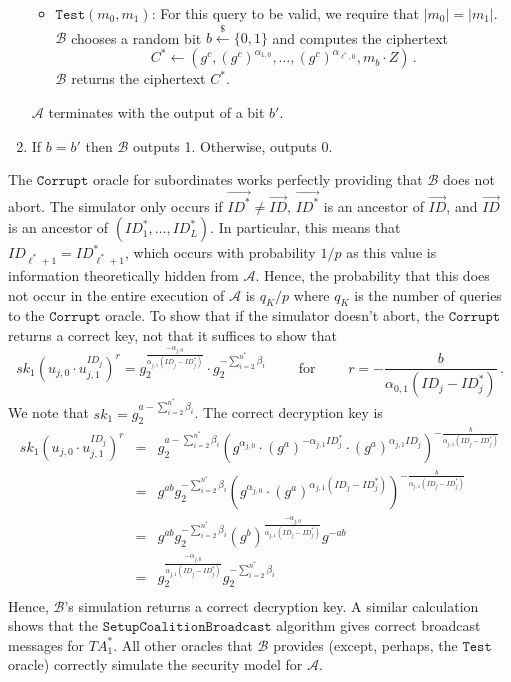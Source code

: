 \documentclass[10pt]{llncs}
\newcommand{\A}{\mathcal{A}}
\newcommand{\B}{\mathcal{B}}
\newcommand{\ID}{\mathit{ID}}
\newcommand{\TA}{\mathit{TA}}
\newcommand{\sk}{\mathit{sk}}
\newcommand{\getsr}{\stackrel{{\scriptscriptstyle\$}}{\gets}}
\begin{document}
\begin{enumerate}
\begin{itemize}
	\item $\texttt{Test}(m_{0},m_{1})$: For this query to be valid, we require that $|m_{0}|=|m_{1}|$. $\B$ chooses a random bit $b\getsr \{0,1\}$ and computes the ciphertext 
		\begin{displaymath}
		C^{*} \gets (g^{c},(g^{c})^{\alpha_{1,0}}, \ldots, (g^{c})^{\alpha_{\ell^{*},0}}, m_{b}\cdot Z) \, .
		\end{displaymath}
		$\B$ returns the ciphertext $C^{*}$.
	\end{itemize}
	$\A$ terminates with the output of a bit $b'$.
\item If $b=b'$ then $\B$ outputs 1. Otherwise, outputs 0.
\end{enumerate}

The $\texttt{Corrupt}$ oracle for subordinates works perfectly providing that $\B$ does not abort. The simulator only occurs if $\vec{\ID^{*}}\neq \vec{\ID}$, $\vec{\ID^{*}}$ is an ancestor of $\vec{\ID}$, and $\vec{\ID}$ is an ancestor of $(\ID^{*}_{1},\ldots,\ID^{*}_{L})$. In particular, this means that $\ID_{\ell^{*}+1} = \ID^{*}_{\ell^{*}+1}$, which occurs with probability $1/p$ as this value is information theoretically hidden from $\A$. Hence, the probability that this does not occur in the entire execution of $\A$ is $q_{K}/p$ where $q_{K}$ is the number of queries to the $\texttt{Corrupt}$ oracle. To show that if the simulator doesn't abort, the $\texttt{Corrupt}$ returns a correct key, not that it suffices to show that 
\begin{displaymath}
\sk_1 \left(u_{j,0}\cdot u_{j,1}^{\ID_{j}}\right)^{r} = g_{2}^{\frac{-\alpha_{j,0}}{\alpha_{j,1}(\ID_{j}-\ID^{*}_{j})}} \cdot g_{2}^{-\sum_{i=2}^{n^{*}} \beta_{i}} \qquad \mbox{ for } \qquad r = -\frac{b}{\alpha_{0,1}(\ID_{j}-\ID^{*}_{j})}\, .
\end{displaymath}
We note that $\sk_1 = g_{2}^{a-\sum_{i=2}^{n^{*}} \beta_{i}}$. The correct decryption key is
\begin{eqnarray*}
\sk_1 \left(u_{j,0}\cdot u_{j,1}^{\ID_{j}}\right)^{r} &=& g_{2}^{a-\sum_{i=2}^{n^{*}} \beta_{i}} \left( g^{\alpha_{j,0}} \cdot (g^{a})^{-\alpha_{j,1}\ID^{*}_{j}} \cdot (g^{a})^{\alpha_{j,1}\ID_{j}} \right)^{-\frac{b}{\alpha_{j,1}(\ID_{j}-\ID^{*}_{j})}}\\
&=& g^{ab} g_{2}^{-\sum_{i=2}^{n^{*}}\beta_{i}} \left( g^{\alpha_{j,0}} \cdot (g^{a})^{\alpha_{j,1}(\ID_{j}-\ID^{*}_{j})} \right)^{-\frac{b}{\alpha_{j,1}(\ID_{j}-\ID^{*}_{j})}} 
\\
&=& g^{ab} g_{2}^{-\sum_{i=2}^{n^{*}}\beta_{i}} (g^{b})^{\frac{-\alpha_{j,0}}{\alpha_{j,1}(\ID_{j}-\ID^{*}_{j})}}g^{-ab}\\
&=& g_{2}^{\frac{-\alpha_{j,0}}{\alpha_{j,1}(\ID_{j}-\ID^{*}_{j})}} g_{2}^{-\sum_{i=2}^{n^{*}}\beta_{i}}\\
\end{eqnarray*}
Hence, $\B$'s simulation returns a correct decryption key. A similar calculation shows that the $\texttt{SetupCoalitionBroadcast}$ algorithm gives correct broadcast messages for $\TA^{*}_{1}$. All other oracles that $\B$ provides (except, perhaps, the $\texttt{Test}$ oracle) correctly simulate the security model for $\A$.
\end{document}
